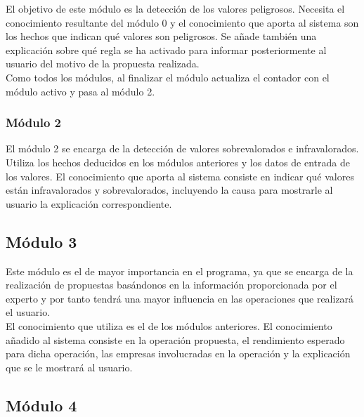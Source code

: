 \documentclass[11pt,leqno]{article}
\theoremstyle{definition_wo_parentheses}
\theoremstyle{plain}
\theoremstyle{remark}
\begin{document}
	El objetivo de este módulo es la detección de los valores peligrosos. Necesita el conocimiento resultante del módulo 0 y el conocimiento que aporta al sistema son los hechos que indican qué valores son peligrosos. Se añade también una explicación sobre qué regla se ha activado para informar posteriormente al usuario del motivo de la propuesta realizada.\\
	
	Como todos los módulos, al finalizar el módulo actualiza el contador con el módulo activo y pasa al módulo 2.
	
	
\subsubsection{Módulo 2}

	El módulo 2 se encarga de la detección de valores sobrevalorados e infravalorados. Utiliza los hechos deducidos en los módulos anteriores y los datos de entrada de los valores. El conocimiento que aporta al sistema consiste en indicar qué valores están infravalorados y sobrevalorados, incluyendo la causa para mostrarle al usuario la explicación correspondiente.
	
\subsection{Módulo 3}

	Este módulo es el de mayor importancia en el programa, ya que se encarga de la realización de propuestas basándonos en la información proporcionada por el experto y por tanto tendrá una mayor influencia en las operaciones que realizará el usuario. \\
	El conocimiento que utiliza es el de los módulos anteriores. El conocimiento añadido al sistema consiste en la operación propuesta, el rendimiento esperado para dicha operación, las empresas involucradas en la operación y la explicación que se le mostrará al usuario. 
	
\subsection{Módulo 4}
\end{document}
